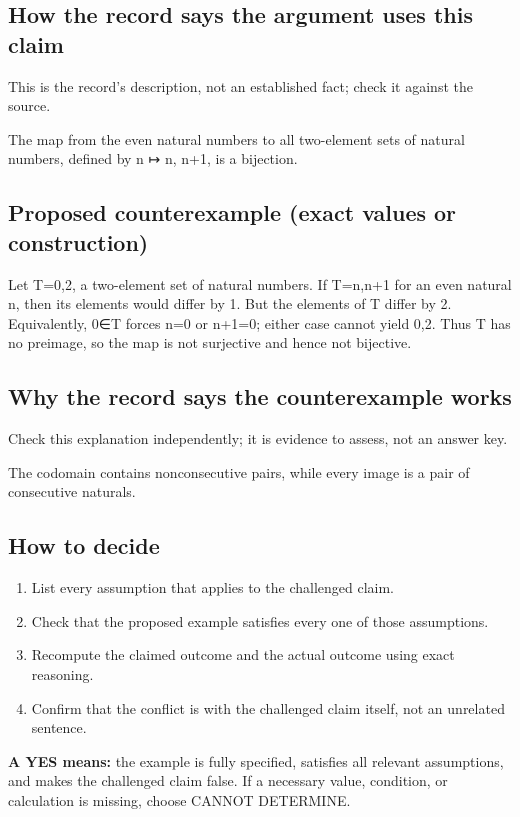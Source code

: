 \documentclass[11pt]{article}
\begin{document}
\subsection*{How the record says the argument uses this claim}
This is the record's description, not an established fact; check it against the source.
\begin{Vsrc}
The map from the even natural numbers to all two-element sets of natural numbers, defined by n ↦ {n, n+1}, is a bijection.
\end{Vsrc}
\subsection*{Proposed counterexample (exact values or construction)}
\begin{Vsrc}
Let T={0,2}, a two-element set of natural numbers. If T={n,n+1} for an even natural n, then its elements would differ by 1. But the elements of T differ by 2. Equivalently, 0∈T forces n=0 or n+1=0; either case cannot yield {0,2}. Thus T has no preimage, so the map is not surjective and hence not bijective.
\end{Vsrc}
\subsection*{Why the record says the counterexample works}
Check this explanation independently; it is evidence to assess, not an answer key.
\begin{Vsrc}
The codomain contains nonconsecutive pairs, while every image is a pair of consecutive naturals.
\end{Vsrc}
\subsection*{How to decide}
\begin{enumerate}
\item List every assumption that applies to the challenged claim.
\item Check that the proposed example satisfies every one of those assumptions.
\item Recompute the claimed outcome and the actual outcome using exact reasoning.
\item Confirm that the conflict is with the challenged claim itself, not an unrelated sentence.
\end{enumerate}
\textbf{A YES means:} the example is fully specified, satisfies all relevant assumptions, and makes the challenged claim false. If a necessary value, condition, or calculation is missing, choose CANNOT DETERMINE.
\end{document}
